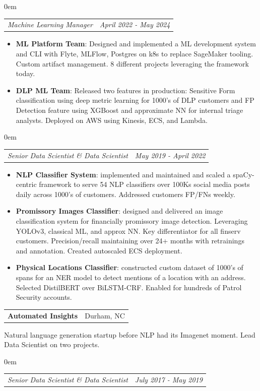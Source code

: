 \documentclass[letterpaper,11pt]{article}
\makeatletter
\newcommand{\resumeItem}[2]{
	\item\small{
		\textbf{#1}{: #2 \vspace{-2pt}}
	}
}
\newcommand{\resumeSubSubheading}[2]{
	\begin{addmargin}[1em]{0em}
		\begin{tabular*}{0.97\textwidth}{l@{\extracolsep{\fill}}r}
			\textit{#1} & \textit{\small #2} \\
		\end{tabular*}\vspace{-5pt}
	\end{addmargin}
}
\newcommand{\resumeItemListStart}{\begin{itemize}}
\newcommand{\resumeItemListEnd}{\end{itemize}\vspace{-5pt}}
\newcommand{\resumeJob}[3]{
	\vspace{3pt}
	\begin{tabular*}{0.97\textwidth}{l@{\extracolsep{\fill}}r}
		\textbf{#1} & #2 \\
	\end{tabular*}\vspace{4pt}
	\small{#3} \vspace{6pt}
}
\makeatother
\begin{document}
		\smallskip
	\smallskip
	
	
	\resumeSubSubheading{Machine Learning Manager}{April 2022 - May 2024}
	\resumeItemListStart
	\resumeItem{ML Platform Team}
	{Designed and implemented a ML development system and CLI with Flyte, MLFlow, Postgres on k8s to replace SageMaker tooling. Custom artifact management. 8 different projects leveraging the framework today.}
	\resumeItem{DLP ML Team}{Released two features in production: Sensitive Form classification using deep metric learning for 1000's of DLP customers and FP Detection feature using XGBoost and approximate NN for internal triage analysts. Deployed on AWS using Kinesis, ECS, and Lambda. }
	\resumeItemListEnd
	\smallskip
	\smallskip
	
	\resumeSubSubheading{Senior Data Scientist \& Data Scientist}{May 2019 - April 2022}
	\resumeItemListStart
	\resumeItem{NLP Classifier System}{implemented and maintained and scaled a spaCy-centric framework to
	serve 54 NLP classifiers over 100Ks social media posts daily across 1000's of customers. Addressed customers FP/FNs weekly.}
	\resumeItem{Promissory Images Classifier}{designed and delivered an image classification system for financially promissory image detection. Leveraging YOLOv3, classical ML, and approx NN. Key differentiator for all finserv customers. Precision/recall maintaining over 24+ months with retrainings and annotation. Created autoscaled ECS deployment.}
	\resumeItem{Physical Locations Classifier}{constructed custom dataset of 1000's of spans for an NER model to detect mentions of a location
		with an address. Selected DistilBERT over BiLSTM-CRF. Enabled for hundreds of Patrol Security accounts.}
	\resumeItemListEnd
	
	\smallskip
	\smallskip
	
	\resumeJob{Automated Insights}{Durham, NC}{Natural language generation startup before NLP had its Imagenet moment. Lead Data Scientist on two projects.}
	
	\resumeSubSubheading{Senior Data Scientist \& Data Scientist}{July 2017 - May 2019}
	
	\smallskip
	\smallskip
	
\end{document}
